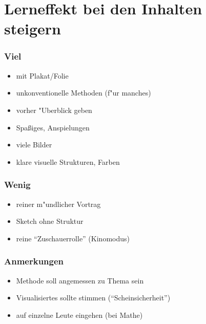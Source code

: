 \section{Lerneffekt bei den Inhalten steigern}
\label{lerneffekt}

\subsubsection{Viel}
\begin{itemize}
\item mit Plakat/Folie
\item unkonventionelle Methoden (f"ur manches)
\item vorher "Uberblick geben
\item Spaßiges, Anspielungen
\item viele Bilder
\item klare visuelle Strukturen, Farben
\end{itemize}

\subsubsection{Wenig}
\begin{itemize}
\item reiner m"undlicher Vortrag
\item Sketch ohne Struktur
\item reine "`Zuschauerrolle"' (Kinomodus)
\end{itemize}

\subsubsection{Anmerkungen}
\begin{itemize}
\item Methode soll angemessen zu Thema sein
\item Visualisiertes sollte stimmen ("`Scheinsicherheit"')
\item auf einzelne Leute eingehen (bei Mathe)
\end{itemize}

